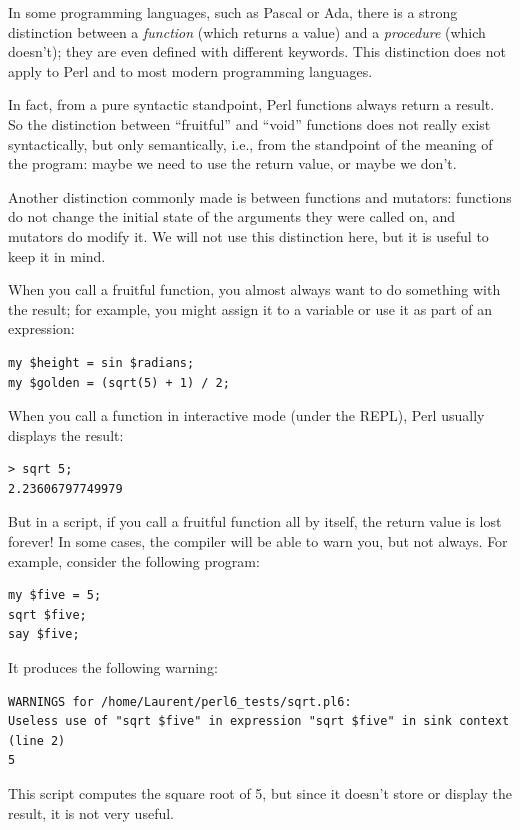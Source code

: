 In some programming languages, such as Pascal or Ada, there 
is a strong distinction between a \emph{function} (which 
returns a value) and a \emph{procedure} (which doesn't); 
they are even defined with different keywords. This 
distinction does not apply to Perl and to most modern 
programming languages.

In fact, from a pure syntactic standpoint, Perl functions 
always return a result. So the distinction between 
``fruitful'' and ``void'' functions does not really exist 
syntactically, but only semantically, i.e., from the 
standpoint of the meaning of the program: maybe we need to 
use the return value, or maybe we don't.

Another distinction commonly made is between functions and 
mutators: functions do not change the initial state of the 
arguments they were called on, and mutators do modify it. We 
will not use this distinction here, but it is useful to 
keep it in mind.

When you call a fruitful function, you almost always
want to do something with the result; for example, you might
assign it to a variable or use it as part of an expression:

\begin{verbatim}
my $height = sin $radians;
my $golden = (sqrt(5) + 1) / 2;
\end{verbatim}
%
When you call a function in interactive mode (under the 
REPL), Perl usually displays the result:

\begin{verbatim}
> sqrt 5;
2.23606797749979
\end{verbatim}
%
But in a script, if you call a fruitful function all by 
itself, the return value is lost forever! In some cases, the 
compiler will be able to warn you, but not always. For example, 
consider the following program:

\begin{verbatim}
my $five = 5;
sqrt $five;
say $five;
\end{verbatim}

It produces the following warning:

\begin{verbatim}
WARNINGS for /home/Laurent/perl6_tests/sqrt.pl6:
Useless use of "sqrt $five" in expression "sqrt $five" in sink context (line 2)
5
\end{verbatim}
%
This script computes the square root of 5, but since 
it doesn't store or display the result, it is not very useful.

